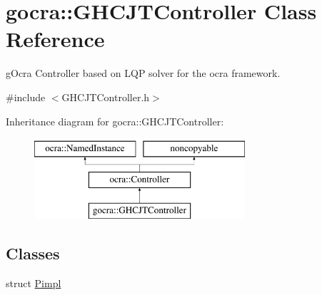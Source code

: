 \hypertarget{classgocra_1_1GHCJTController}{}\section{gocra\+:\+:G\+H\+C\+J\+T\+Controller Class Reference}
\label{classgocra_1_1GHCJTController}


g\+Ocra Controller based on L\+QP solver for the ocra framework.  




{\ttfamily \#include $<$G\+H\+C\+J\+T\+Controller.\+h$>$}

Inheritance diagram for gocra\+:\+:G\+H\+C\+J\+T\+Controller\+:\begin{figure}[H]
\begin{center}
\leavevmode
\includegraphics[height=3.000000cm]{d6/dbf/classgocra_1_1GHCJTController}
\end{center}
\end{figure}
\subsection*{Classes}
\begin{DoxyCompactItemize}
\item 
struct \hyperlink{structgocra_1_1GHCJTController_1_1Pimpl}{Pimpl}
\end{DoxyCompactItemize}
